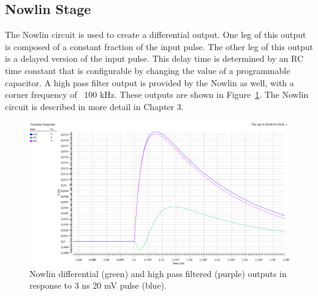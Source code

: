 \documentclass[12pt,oneside,final]{siuethesis}
\theoremstyle{definition}
\begin{document}
\subsection{Nowlin Stage}
\par The Nowlin circuit is used to create a differential output. One leg of this output is composed of a constant fraction of the input pulse. The other leg of this output is a delayed version of the input pulse. This delay time is determined by an RC time constant that is configurable by changing the value of a programmable capacitor. A high pass filter output is provided by the Nowlin as well, with a corner frequency of ~100 kHz. These outputs are shown in Figure~\ref{fig:nowlinout}. The Nowlin circuit is described in more detail in Chapter 3.
\begin{figure}[h]
\centering
\includegraphics[scale=.40,keepaspectratio=true]{images/nowlin_out.png} 
\caption{Nowlin differential (green) and high pass filtered (purple) outputs in response to 3 ns 20 mV pulse (blue). }
\label{fig:nowlinout}
\end{figure}
\end{document}
